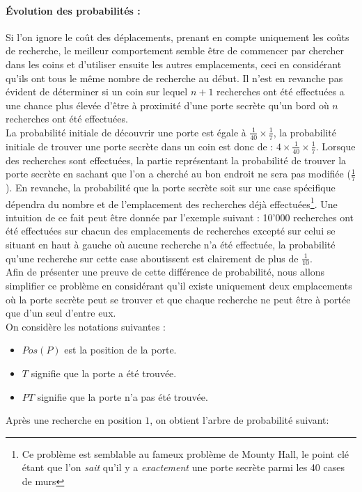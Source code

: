 \documentclass[a4paper,12pt]{article}
\begin{document}
\paragraph{Évolution des probabilités :}
Si l'on ignore le coût des déplacements, prenant en compte uniquement les coûts
de recherche, le meilleur comportement semble être de commencer par chercher
dans les coins et d'utiliser ensuite les autres emplacements, ceci en
considérant qu'ils ont tous le même nombre de recherche au début. Il n'est en
revanche pas évident de déterminer si un coin sur lequel $n+1$ recherches ont
été effectuées a une chance plus élevée d'être à proximité d'une porte secrète
qu'un bord où $n$ recherches ont été effectuées.
\\
La probabilité initiale de découvrir une porte est égale à 
$\frac{1}{40} \times \frac{1}{7}$, la probabilité initiale de trouver une porte
secrète dans un coin est donc de : $4 \times \frac{1}{40} \times \frac{1}{7}$.
Lorsque des recherches sont effectuées, la partie représentant la probabilité de
trouver la porte secrète en sachant que l'on a cherché au bon endroit ne sera
pas modifiée ($\frac{1}{7}$). En revanche, la probabilité que la porte secrète
soit sur une case spécifique dépendra du nombre et de l'emplacement des
recherches déjà effectuées\footnote{Ce problème est semblable au fameux
problème de Mounty Hall, le point clé étant que l'on {\em sait} qu'il y a 
{\em exactement} une porte secrète parmi les 40 cases de murs}. Une intuition de
ce fait peut être donnée par l'exemple suivant : 10'000 recherches ont été
effectuées sur chacun des emplacements de recherches excepté sur celui se
situant en haut à gauche où aucune recherche n'a été effectuée, la probabilité
qu'une recherche sur cette case aboutissent est clairement de plus de 
$\frac{1}{10}$.
\\
Afin de présenter une preuve de cette différence de probabilité, nous allons
simplifier ce problème en considérant qu'il existe uniquement deux emplacements
où la porte secrète peut se trouver et que chaque recherche ne peut être à
portée que d'un seul d'entre eux.\\
On considère les notations suivantes :
\begin{itemize}
\item $Pos(P)$ est la position de la porte.
\item $T$ signifie que la porte a été trouvée.
\item $PT$ signifie que la porte n'a pas été trouvée.
\end{itemize}
Après une recherche en position $1$, on obtient l'arbre de probabilité suivant:
\end{document}
